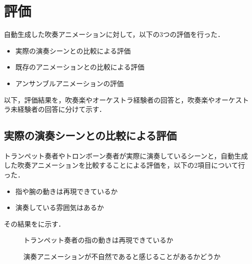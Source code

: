 \section{評価} \label{sec:review}
自動生成した吹奏アニメーションに対して，以下の3つの評価を行った．
\begin{itemize}
	\item 実際の演奏シーンとの比較による評価
	\item 既存のアニメーションとの比較による評価
	\item アンサンブルアニメーションの評価
\end{itemize}
以下，評価結果を，吹奏楽やオーケストラ経験者の回答と，吹奏楽やオーケストラ未経験者の回答に分けて示す．

\subsection{実際の演奏シーンとの比較による評価}
トランペット奏者やトロンボーン奏者が実際に演奏しているシーンと，自動生成した吹奏アニメーションを比較することによる評価を，以下の2項目について行った．
\begin{itemize}
	\item 指や腕の動きは再現できているか
	\item 演奏している雰囲気はあるか
\end{itemize}
その結果をに示す．
\begin{figure}[h]
	\centering
	\hspace{2mm}
	\caption{トランペット奏者の指の動きは再現できているか}
	\label{fig:Q1-tp}
\end{figure}

\begin{figure}[h]
	\centering
	\caption{演奏アニメーションが不自然であると感じることがあるかどうか}
	\label{fig:Q1-tb}
\end{figure}

